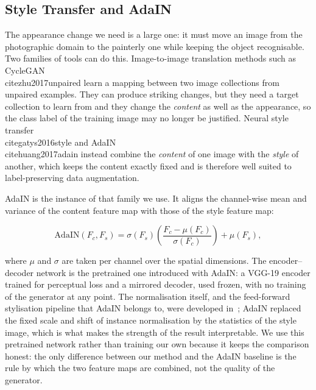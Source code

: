\subsection{Style Transfer and AdaIN}
\label{sec:adain}

The appearance change we need is a large one: it must move an image from the
photographic domain to the painterly one while keeping the object
recognisable. Two families of tools can do this. Image-to-image translation
methods such as CycleGAN~\\cite{zhu2017unpaired} learn a mapping between two image
collections from unpaired examples. They can produce striking changes, but
they need a target collection to learn from and they change the
\emph{content} as well as the appearance, so the class label of the training
image may no longer be justified. Neural style transfer
\\cite{gatys2016style} and AdaIN~\\cite{huang2017adain} instead combine the
\emph{content} of one image with the \emph{style} of another, which keeps the
content exactly fixed and is therefore well suited to label-preserving data
augmentation.

AdaIN is the instance of that family we use. It aligns the channel-wise
mean and variance of the content feature map with those of the style feature
map:

\begin{equation}
\mathrm{AdaIN}(F_c, F_s) = \sigma(F_s)\left(\frac{F_c - \mu(F_c)}{\sigma(F_c)}\right) + \mu(F_s),
\label{eq:adain}
\end{equation}

where $\mu$ and $\sigma$ are taken per channel over the spatial dimensions.
The encoder--decoder network is the pretrained one introduced with AdaIN: a
VGG-19 encoder trained for perceptual loss and a mirrored decoder, used
frozen, with no training of the generator at any point. The normalisation
itself, and the feed-forward stylisation pipeline that AdaIN belongs to,
were developed in~\cite{ulyanov2016instance,ulyanov2017improved}; AdaIN
replaced the fixed scale and shift of instance normalisation by the
statistics of the style image, which is what makes the strength of the
result interpretable. We use this
pretrained network rather than training our own because it keeps the
comparison honest: the only difference between our method and the AdaIN
baseline is the rule by which the two feature maps are combined, not the
quality of the generator.

